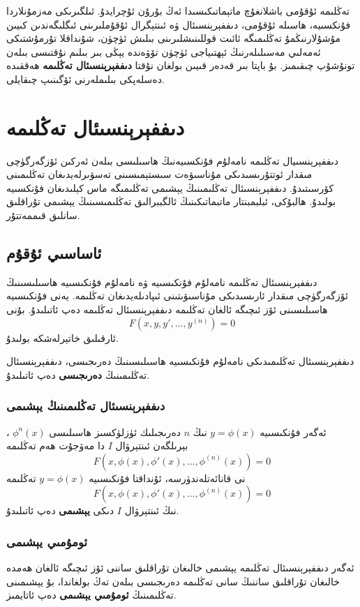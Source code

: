 \par\bigskip
\begin{tcolorbox}
تەڭلىمە ئۇقۇمى باشلانغۇچ ماتېماتىكىسىدا ئەڭ بۇرۇن ئۇچرايدۇ. ئىلگىرىكى مەزمۇنلاردا فۇنكسىيە، ھاسىلە ئۇقۇمى، دىففېرېنسىئال ۋە ئىنتېگرال ئۇقۇملىرىنى ئىگلىگەندىن كىيىن مۇشۇلارنىڭمۇ تەڭلىمىگە ئائىت قوللىنىشلىرىنى بىلىش ئۈچۈن، شۇنداقلا تۇرمۇشتىكى ئەمەلىي مەسىلىلەرنىڭ ئېھتىياجى ئۈچۈن تۆۋەندە يېڭى بىر بىلىم نۇقتىسى بىلەن تونۇشۇپ چىقىمىز. بۇ باپتا بىر قەدەر قىيىن بولغان نۇقتا
\textbf{دىففېرېنسىئال تەڭلىمە}
ھەققىدە دەسلەپكى بىلىملەرنى ئۆگىنىپ چىقايلى.

\end{tcolorbox}
\section{دىففېرېنسىئال تەڭلىمە}
دىففېرېنسىيال تەڭلىمە نامەلۇم فۇنكسىيەنىڭ ھاسىلىسى بىلەن ئەركىن ئۆزگەرگۈچى مىقدار ئوتتۇرىسىدىكى مۇناسىۋەت سىستېمىسىنى تەسۋىرلەيدىغان تەڭلىمىنى كۆرسىتىدۇ. دىففېرېنسىئال تەڭلىمىنىڭ يېشىمى تەڭلىمىگە ماس كېلىدىغان فۇنكسىيە بولىدۇ. ھالبۇكى، ئبلبمبنتار ماتبماتىكىنىڭ ئالگببرالىق تەڭلىمىسىنىڭ يېشىمى تۇراقلىق سانلىق قىممەتتۇر. 
\subsection{ئاساسىي ئۇقۇم}

\begin{MyDefinition}{دىففېرېنسىئال تەڭلىمە}{}
	نامەلۇم فۇنكىسىيە ۋە نامەلۇم فۇنكىسىيە ھاسىلىسىنىڭ ئۆزگەرگۈچى مىقدار ئارىسىدىكى مۇناسىۋىتىنى ئىپادىلەيدىغان تەڭلىمە. يەنى فۇنكىسىيە ھاسىلىسىنى ئۆز ئىچىگە ئالغان تەڭلىمە دىففېرېنسىئال تەڭلىمە دەپ ئاتىلىدۇ. بۇنى $$F(x,y,y',...,y^{(n)})=0$$ ئارقىلىق خاتېرلەشكە بولىدۇ.
\end{MyDefinition}
دىففېرېنسىئال تەڭلىمىدىكى نامەلۇم فۇنكىسىيە ھاسىلىسىنىڭ دەرىجىسى، دىففېرېنسىئال تەڭلىمىنىڭ \textbf{دەرىجىسى} دەپ ئاتىلىدۇ.

\subsubsection{دىففېرېنسىئال تەڭلىمىنىڭ يېشىمى}
ئەگەر فۇنكىسىيە $y=\phi(x)$ نىڭ $n$ دەرىجىلىك ئۈزلۈكسىز ھاسىلىسى $\phi^n(x)$ ، بېرىلگەن ئىنتېرۋال $I$ دا مەۋجۇت ھەم تەڭلىمە
$$F(x,\phi(x),\phi'(x),...,\phi^{(n)}(x))=0$$
نى قانائەتلەندۈرسە، ئۇنداقتا فۇنكىسىيە $y=\phi(x)$ تەڭلىمە
$$F(x,\phi(x),\phi'(x),...,\phi^{(n)}(x))=0$$
نىڭ ئىنتېرۋال $I$ دىكى \textbf{يېشىمى} دەپ ئاتىلىدۇ. 
\subsubsection{ئومۇمىي يېشىمى}
ئەگەر دىففېرېنسىئال تەڭلىمە يېشىمى خالىغان تۇراقلىق ساننى ئۆز ئىچىگە ئالغان ھەمدە خالىغان تۇراقلىق ساننىڭ سانى تەڭلىمە دەرىجىسى بىلەن تەڭ بولغاندا، بۇ يېشىمىنى تەڭلىمىنىڭ \textbf{ئومۇمىي يېشىمى} دەپ ئاتايمىز.
